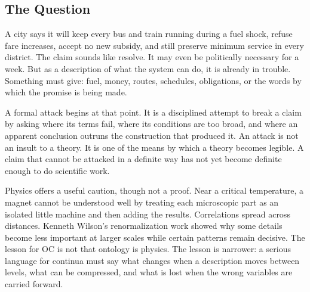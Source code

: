 \documentclass[11pt,a4paper,openany]{book}
\begin{document}
\subsection{The Question}
A city says it will keep every bus and train running during a fuel shock, refuse fare increases, accept no new subsidy, and still preserve minimum service in every district. The claim sounds like resolve. It may even be politically necessary for a week. But as a description of what the system can do, it is already in trouble. Something must give: fuel, money, routes, schedules, obligations, or the words by which the promise is being made. \cite{kadanoff_scaling,wilson_renormalization}\par
A formal attack begins at that point. It is a disciplined attempt to break a claim by asking where its terms fail, where its conditions are too broad, and where an apparent conclusion outruns the construction that produced it. An attack is not an insult to a theory. It is one of the means by which a theory becomes legible. A claim that cannot be attacked in a definite way has not yet become definite enough to do scientific work.\par
Physics offers a useful caution, though not a proof. Near a critical temperature, a magnet cannot be understood well by treating each microscopic part as an isolated little machine and then adding the results. Correlations spread across distances. Kenneth Wilson's renormalization work showed why some details become less important at larger scales while certain patterns remain decisive. The lesson for OC is not that ontology is physics. The lesson is narrower: a serious language for continua must say what changes when a description moves between levels, what can be compressed, and what is lost when the wrong variables are carried forward.\par
\end{document}
